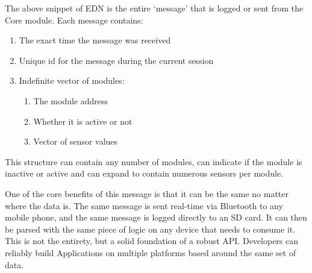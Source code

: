 The above snippet of EDN is the entire `message' that is logged or sent from the Core module. Each message contains:

\begin{enumerate}
  \item The exact time the message was received
  \item Unique id for the message during the current session
  \item Indefinite vector of modules:
  \begin{enumerate}
    \item The module address
    \item Whether it is active or not
    \item Vector of sensor values 
  \end{enumerate}
\end{enumerate}

This structure can contain any number of modules, can indicate if the module is inactive or active and can expand to contain numerous sensors per module. 

One of the core benefits of this message is that it can be the same no matter where the data is. The same message is sent real-time via Bluetooth to any mobile phone, and the same message is logged directly to an SD card. It can then be parsed with the same piece of logic on any device that needs to consume it. This is not the entirety, but a solid foundation of a robust API. Developers can reliably build Applications on multiple platforms based around the same set of data. 